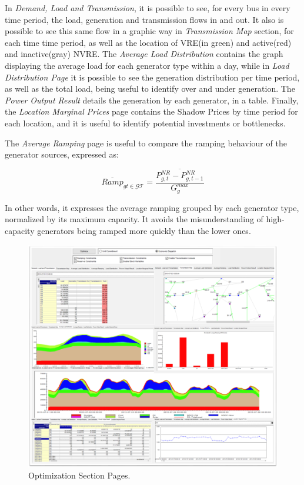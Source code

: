 \documentclass[12pt,LUDisStyle,twosided]{book}
\newcommand{\mc}{\mathcal}
\begin{document}
In \textit{Demand, Load and Transmission}, it is possible to see, for every bus in every time period, the load, generation and transmission flows in and out. It also is possible to see this same flow in a graphic way in \textit{Transmission Map} section, for each time time period, as well as the location of VRE(in green) and active(red) and inactive(gray) NVRE. The \textit{Average Load Distribution} contains the graph displaying the average load for each generator type within a day, while in \textit{Load Distribution Page} it is possible to see the generation distribution per time period, as well as the total load, being useful to identify over and under generation. The \textit{Power Output Result} details the generation by each generator, in a table. Finally, the \textit{Location Marginal Prices} page contains the Shadow Prices by time period for each location, and it is useful to identify potential investments or bottlenecks.

The \textit{Average Ramping} page is useful to compare the ramping behaviour of the generator sources, expressed as:

\begin{equation}
    \overline{Ramp}_{gt \in \mc{GT}} = \overline{\dfrac{P^{NR}_{g,t} - P^{NR}_{g,t-1}}{G^{max}_{g}}}
\end{equation}

In other words, it expresses the average ramping grouped by each generator type, normalized by its maximum capacity. It avoids the misunderstanding of high-capacity generators being ramped more quickly than the lower ones.

\begin{figure}[H] 
	\begin{center}
		\includegraphics[width=\textwidth,height=\textheight,keepaspectratio]{aimmsOptimizationSectionPages.png}
	  	\caption{Optimization Section Pages.}
     	\label{fig:optimizationSectionPages}
	\end{center}
\end{figure}
\end{document}
